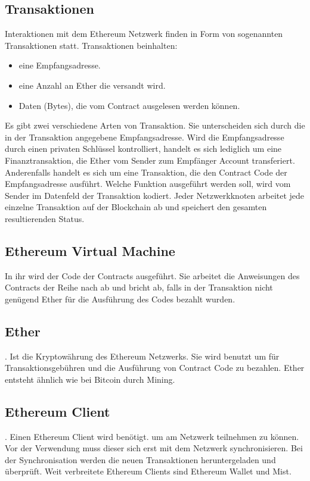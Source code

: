 \subsection{Transaktionen}
Interaktionen mit dem Ethereum Netzwerk finden in Form von sogenannten Transaktionen statt. Transaktionen beinhalten:
\begin{itemize}
\item eine Empfangsadresse.
\item eine Anzahl an Ether die versandt wird.
\item Daten (Bytes), die vom Contract ausgelesen werden können.
\end{itemize}

Es gibt zwei verschiedene Arten von Transaktion. Sie unterscheiden sich durch die in der Transaktion angegebene Empfangsadresse. 
Wird die Empfangsadresse durch einen privaten Schlüssel kontrolliert, handelt es sich lediglich um eine Finanztransaktion, die Ether vom Sender zum Empfänger Account transferiert. Anderenfalls handelt es sich um eine Transaktion, die den Contract Code der Empfangsadresse ausführt. Welche Funktion ausgeführt werden soll, wird vom Sender im Datenfeld der Transaktion kodiert. Jeder Netzwerkknoten arbeitet jede einzelne Transaktion auf der Blockchain ab und speichert den gesamten resultierenden Status. 
\subsection{Ethereum Virtual Machine}
In ihr wird der Code der Contracts ausgeführt. Sie arbeitet die Anweisungen des Contracts der Reihe nach ab und bricht ab, falls in der Transaktion nicht genügend Ether für die Ausführung des Codes bezahlt wurden.
\subsection{Ether}. 
Ist die Kryptowährung des Ethereum Netzwerks. Sie wird benutzt um für Transaktionsgebühren und die Ausführung von Contract Code zu bezahlen. Ether entsteht ähnlich wie bei Bitcoin durch Mining.
\subsection{Ethereum Client}. 
Einen Ethereum Client wird benötigt. um am Netzwerk teilnehmen zu können. Vor der Verwendung muss dieser sich erst mit dem Netzwerk synchronisieren. Bei der Synchronisation werden die neuen Transaktionen heruntergeladen und überprüft. Weit verbreitete Ethereum Clients sind Ethereum Wallet und Mist.
